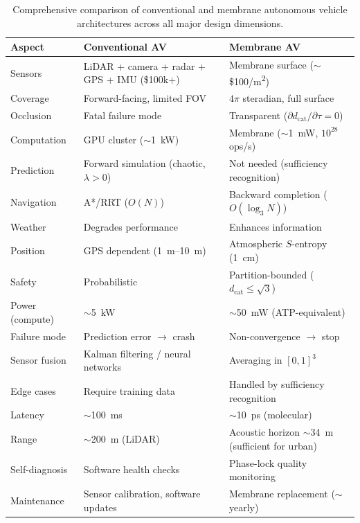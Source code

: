 \documentclass[twocolumn,10pt]{article}
\theoremstyle{definition}
\theoremstyle{remark}
\newcommand{\dcat}{d_{\mathrm{cat}}}
\begin{document}
\begin{table}[H]
\centering
\caption{Comprehensive comparison of conventional and membrane autonomous vehicle architectures across all major design dimensions.}
\label{tab:comparison}
\small
\begin{tabularx}{\textwidth}{@{}p{2.8cm}p{4.5cm}X@{}}
\toprule
\textbf{Aspect} & \textbf{Conventional AV} & \textbf{Membrane AV} \\
\midrule
Sensors & LiDAR + camera + radar + GPS + IMU (\$100k+) & Membrane surface ($\sim$\$100/\si{m^2}) \\
Coverage & Forward-facing, limited FOV & $4\pi$ steradian, full surface \\
Occlusion & Fatal failure mode & Transparent ($\partial\dcat/\partial\tau = 0$) \\
Computation & GPU cluster ($\sim$\SI{1}{kW}) & Membrane ($\sim$\SI{1}{mW}, $10^{28}$ ops/s) \\
Prediction & Forward simulation (chaotic, $\lambda > 0$) & Not needed (sufficiency recognition) \\
Navigation & A*/RRT ($O(N)$) & Backward completion ($O(\log_3 N)$) \\
Weather & Degrades performance & Enhances information \\
Position & GPS dependent (\SI{1}{m}--\SI{10}{m}) & Atmospheric $S$-entropy (\SI{1}{cm}) \\
Safety & Probabilistic & Partition-bounded ($\dcat \leq \sqrt{3}$) \\
Power (compute) & $\sim$\SI{5}{kW} & $\sim$\SI{50}{mW} (ATP-equivalent) \\
Failure mode & Prediction error $\to$ crash & Non-convergence $\to$ stop \\
Sensor fusion & Kalman filtering / neural networks & Averaging in $[0,1]^3$ \\
Edge cases & Require training data & Handled by sufficiency recognition \\
Latency & $\sim$\SI{100}{ms} & $\sim$\SI{10}{ps} (molecular) \\
Range & $\sim$\SI{200}{m} (LiDAR) & Acoustic horizon $\sim$\SI{34}{m} (sufficient for urban) \\
Self-diagnosis & Software health checks & Phase-lock quality monitoring \\
Maintenance & Sensor calibration, software updates & Membrane replacement ($\sim$yearly) \\
\bottomrule
\end{tabularx}
\end{table}
\end{document}
